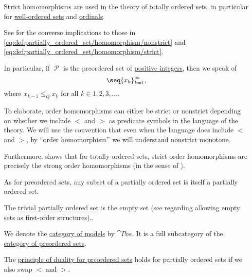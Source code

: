 \begin{definition}
\begin{thmenum}[resume=def:partially_ordered_set]
    Strict homomorphisms are used in the theory of \hyperref[subsec:partially_ordered_sets]{totally ordered sets}, in particular for \hyperref[subsec:well_ordered_sets]{well-ordered sets} and \hyperref[subsec:ordinals]{ordinals}.

    See  for the converse implications to those in \eqref{eq:def:partially_ordered_set/homomorphism/nonstrict} and \eqref{eq:def:partially_ordered_set/homomorphism/strict}.

    In particular, if \( \mscrP \) is the preordered set of \hyperref[rem:peano_arithmetic_zero/nonnegative]{positive integers}, then we speak of 
    \begin{equation}\label{eq:def:partially_ordered_set/homomorphism/sequence}
      \seq{ x_k }_{k=1}^\infty,
    \end{equation}
    where \( x_{k-1} \leq_Q x_k \) for all \( k \in 1, 2, 3, \ldots \).

    To elaborate, order homomorphisms can either be strict or nonstrict depending on whether we include \( < \) and \( > \) as predicate symbols in the language of the theory. We will use the convention that even when the language does include \( < \) and \( > \), by \enquote{order homomorphism} we will understand nonstrict monotone.

    Furthermore,  shows that for totally ordered sets, strict order homomorphisms are precisely the strong order homomorphisms (in the sense of ).

     As for preordered sets, any subset of a partially ordered set is itself a partially ordered set.

     The \hyperref[thm:substructures_form_complete_lattice/bottom]{trivial partially ordered set} is the empty set (see  regarding allowing empty sets as first-order structures)..

     We denote the \hyperref[def:category_of_first_order_models]{category of models} by \( \cat{Pos} \). It is a full subcategory of the \hyperref[def:preordered_set/category]{category of preordered sets}.

     The \hyperref[def:preordered_set/duality]{principle of duality for preordered sets} holds for partially ordered sets if we also swap \( < \) and \( > \).
  \end{thmenum}
\end{definition}
